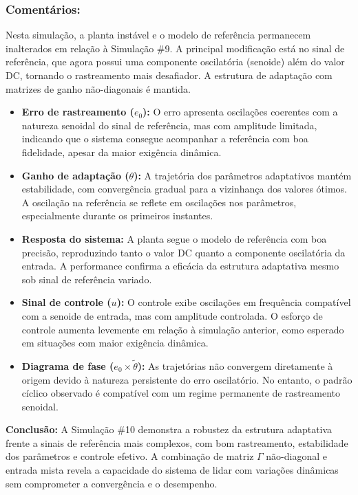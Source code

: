 \documentclass[10pt]{article}
\begin{document}
\subsubsection{Comentários:}

Nesta simulação, a planta instável e o modelo de referência permanecem inalterados em relação à Simulação \#9. A principal modificação está no sinal de referência, que agora possui uma componente oscilatória (senoide) além do valor DC, tornando o rastreamento mais desafiador. A estrutura de adaptação com matrizes de ganho não-diagonais é mantida.

\begin{itemize}
    \item \textbf{Erro de rastreamento ($e_0$):} O erro apresenta oscilações coerentes com a natureza senoidal do sinal de referência, mas com amplitude limitada, indicando que o sistema consegue acompanhar a referência com boa fidelidade, apesar da maior exigência dinâmica.

    \item \textbf{Ganho de adaptação ($\theta$):} A trajetória dos parâmetros adaptativos mantém estabilidade, com convergência gradual para a vizinhança dos valores ótimos. A oscilação na referência se reflete em oscilações nos parâmetros, especialmente durante os primeiros instantes.

    \item \textbf{Resposta do sistema:} A planta segue o modelo de referência com boa precisão, reproduzindo tanto o valor DC quanto a componente oscilatória da entrada. A performance confirma a eficácia da estrutura adaptativa mesmo sob sinal de referência variado.

    \item \textbf{Sinal de controle ($u$):} O controle exibe oscilações em frequência compatível com a senoide de entrada, mas com amplitude controlada. O esforço de controle aumenta levemente em relação à simulação anterior, como esperado em situações com maior exigência dinâmica.

    \item \textbf{Diagrama de fase ($e_0 \times \tilde{\theta}$):} As trajetórias não convergem diretamente à origem devido à natureza persistente do erro oscilatório. No entanto, o padrão cíclico observado é compatível com um regime permanente de rastreamento senoidal.

\end{itemize}

\textbf{Conclusão:} A Simulação \#10 demonstra a robustez da estrutura adaptativa frente a sinais de referência mais complexos, com bom rastreamento, estabilidade dos parâmetros e controle efetivo. A combinação de matriz $\Gamma$ não-diagonal e entrada mista revela a capacidade do sistema de lidar com variações dinâmicas sem comprometer a convergência e o desempenho.
\end{document}
